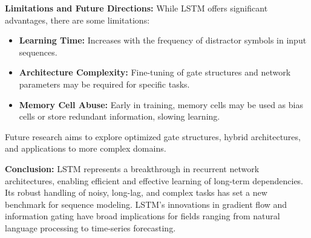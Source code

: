 \documentclass{article}
\begin{document}
\textbf{Limitations and Future Directions:} While LSTM offers significant advantages, there are some limitations:
\begin{itemize}
    \item \textbf{Learning Time:} Increases with the frequency of distractor symbols in input sequences.
    \item \textbf{Architecture Complexity:} Fine-tuning of gate structures and network parameters may be required for specific tasks.
    \item \textbf{Memory Cell Abuse:} Early in training, memory cells may be used as bias cells or store redundant information, slowing learning.
\end{itemize}
Future research aims to explore optimized gate structures, hybrid architectures, and applications to more complex domains.

\textbf{Conclusion:} LSTM represents a breakthrough in recurrent network architectures, enabling efficient and effective learning of long-term dependencies. Its robust handling of noisy, long-lag, and complex tasks has set a new benchmark for sequence modeling. LSTM's innovations in gradient flow and information gating have broad implications for fields ranging from natural language processing to time-series forecasting.
\end{document}
